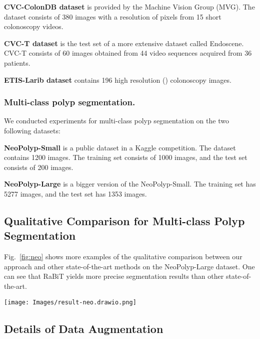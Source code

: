 \documentclass{article}
\begin{document}
\textbf{CVC-ColonDB dataset} \cite{cvc_colon} is provided by the Machine Vision Group (MVG). The dataset consists of 380 images with a resolution of  pixels from 15 short colonoscopy videos.

\textbf{CVC-T dataset} \cite{endo} is the test set of a more extensive dataset called Endoscene. CVC-T consists of 60 images obtained from 44 video sequences acquired from 36 patients.

\textbf{ETIS-Larib dataset} \cite{etis_larib} contains 196 high resolution () colonoscopy images.

\subsubsection{Multi-class polyp segmentation.} We conducted experiments for multi-class polyp segmentation on the two following datasets:

\textbf{NeoPolyp-Small} \cite{neopolyp-small} is a public dataset in a Kaggle competition. The dataset contains 1200 images. The training set consists of 1000 images, and the test set consists of 200 images. 

\textbf{NeoPolyp-Large} \cite{ngoc2021neounet} is a bigger version of the NeoPolyp-Small. The training set has 5277 images, and the test set has 1353 images.

\subsection{Qualitative Comparison for Multi-class Polyp Segmentation}
Fig.~\ref{fig:neo} shows more examples of the qualitative comparison between our approach and other state-of-the-art methods on the NeoPolyp-Large dataset. One can see that RaBiT yields more precise segmentation results than other state-of-the-art.
\begin{figure*}[!ht]
\centering
\texttt{[image: Images/result-neo.drawio.png]}
\caption{Qualitative result comparison in Neo-Large dataset.}
\label{fig:neo}
\end{figure*}

\subsection{Details of Data Augmentation}
\end{document}
